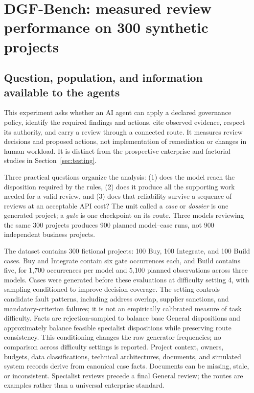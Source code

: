 \section{DGF-Bench: measured review performance on 300 synthetic projects}
\label{sec:benchmark}

\subsection{Question, population, and information available to the agents}

This experiment asks whether an AI agent can apply a declared governance policy, identify the
required findings and actions, cite observed evidence, respect its authority, and carry a review
through a connected route. It measures review decisions and proposed actions, not implementation
of remediation or changes in human workload. It is distinct from the prospective enterprise and
factorial studies in Section~\ref{sec:testing}.

Three practical questions organize the analysis: (1) does the model reach the disposition
required by the rules, (2) does it produce all the supporting work needed for a valid review,
and (3) does that reliability survive a sequence of reviews at an acceptable API cost?
The unit called a \emph{case} or \emph{dossier} is one generated project; a \emph{gate} is one
checkpoint on its route. Three models reviewing the same 300 projects produces 900 planned
model--case runs, not 900 independent business projects.

The dataset contains 300 fictional projects: 100 Buy, 100 Integrate, and 100 Build cases.
Buy and Integrate contain six gate occurrences each, and Build contains five, for 1,700 occurrences
per model and 5,100 planned observations across three models. Cases were generated before these
evaluations at difficulty setting 4, with sampling conditioned to improve decision coverage.
The setting controls candidate fault patterns, including address overlap, supplier sanctions,
and mandatory-criterion failures; it is not an empirically calibrated measure of task difficulty.
Facts are rejection-sampled to balance base General dispositions and approximately balance feasible
specialist dispositions while preserving route consistency. This conditioning changes the raw
generator frequencies; no comparison across difficulty settings is reported.
Project context, owners, budgets, data classifications, technical architectures, documents, and
simulated system records derive from canonical case facts. Documents can be missing, stale, or
inconsistent. Specialist reviews precede a final General review; the routes are examples rather
than a universal enterprise standard.

